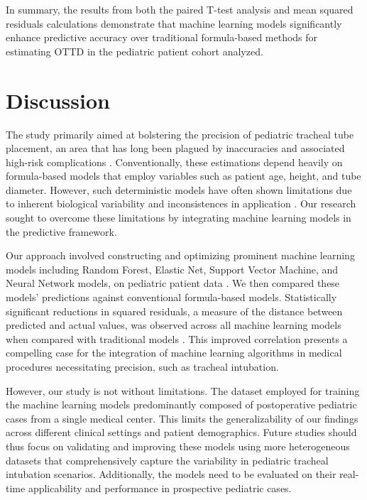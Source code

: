 \documentclass[11pt]{article}
\begin{document}
In summary, the results from both the paired T-test analysis and mean squared residuals calculations demonstrate that machine learning models significantly enhance predictive accuracy over traditional formula-based methods for estimating OTTD in the pediatric patient cohort analyzed.

\section*{Discussion}

The study primarily aimed at bolstering the precision of pediatric tracheal tube placement, an area that has long been plagued by inaccuracies and associated high-risk complications \cite{Kollef1994EndotrachealTM}. Conventionally, these estimations depend heavily on formula-based models that employ variables such as patient age, height, and tube diameter. However, such deterministic models have often shown limitations due to inherent biological variability and inconsistences in application \cite{Tareerath2021AccuracyOA}. Our research sought to overcome these limitations by integrating machine learning models in the predictive framework.

Our approach involved constructing and optimizing prominent machine learning models including Random Forest, Elastic Net, Support Vector Machine, and Neural Network models, on pediatric patient data \cite{Kim2020DifferentCO, Kerrey2009APC}. We then compared these models' predictions against conventional formula-based models. Statistically significant reductions in squared residuals, a measure of the distance between predicted and actual values, was observed across all machine learning models when compared with traditional models \cite{Yoo2021DeepLF, Tareerath2021AccuracyOA}. This improved correlation presents a compelling case for the integration of machine learning algorithms in medical procedures necessitating precision, such as tracheal intubation.

However, our study is not without limitations. The dataset employed for training the machine learning models predominantly composed of postoperative pediatric cases from a single medical center. This limits the generalizability of our findings across different clinical settings and patient demographics. Future studies should thus focus on validating and improving these models using more heterogeneous datasets that comprehensively capture the variability in pediatric tracheal intubation scenarios. Additionally, the models need to be evaluated on their real-time applicability and performance in prospective pediatric cases.
\end{document}
